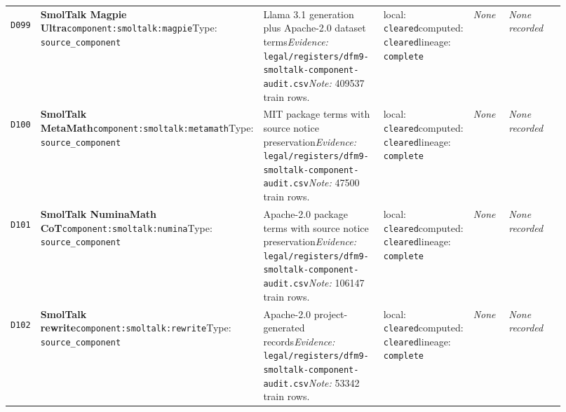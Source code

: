 \documentclass[9pt,a4paper]{article}
\newcommand{\depid}[1]{\hypertarget{dep:#1}{\texttt{#1}}}
\begin{document}
\begin{landscape}
\begin{longtable}{@{}L{0.035\linewidth}L{0.185\linewidth}L{0.27\linewidth}L{0.09\linewidth}L{0.10\linewidth}L{0.24\linewidth}@{}}
\depid{D099} & \textbf{SmolTalk Magpie Ultra}\newline \nolinkurl{component:smoltalk:magpie}\newline Type: \texttt{source\_component} & Llama 3.1 generation plus Apache-2.0 dataset terms\newline \textit{Evidence:} \nolinkurl{legal/registers/dfm9-smoltalk-component-audit.csv}\newline \textit{Note:} 409537 train rows. & local: \texttt{cleared}\newline computed: \texttt{cleared}\newline lineage: \texttt{complete} & \textit{None} & \textit{None recorded} \\
\depid{D100} & \textbf{SmolTalk MetaMath}\newline \nolinkurl{component:smoltalk:metamath}\newline Type: \texttt{source\_component} & MIT package terms with source notice preservation\newline \textit{Evidence:} \nolinkurl{legal/registers/dfm9-smoltalk-component-audit.csv}\newline \textit{Note:} 47500 train rows. & local: \texttt{cleared}\newline computed: \texttt{cleared}\newline lineage: \texttt{complete} & \textit{None} & \textit{None recorded} \\
\depid{D101} & \textbf{SmolTalk NuminaMath CoT}\newline \nolinkurl{component:smoltalk:numina}\newline Type: \texttt{source\_component} & Apache-2.0 package terms with source notice preservation\newline \textit{Evidence:} \nolinkurl{legal/registers/dfm9-smoltalk-component-audit.csv}\newline \textit{Note:} 106147 train rows. & local: \texttt{cleared}\newline computed: \texttt{cleared}\newline lineage: \texttt{complete} & \textit{None} & \textit{None recorded} \\
\depid{D102} & \textbf{SmolTalk rewrite}\newline \nolinkurl{component:smoltalk:rewrite}\newline Type: \texttt{source\_component} & Apache-2.0 project-generated records\newline \textit{Evidence:} \nolinkurl{legal/registers/dfm9-smoltalk-component-audit.csv}\newline \textit{Note:} 53342 train rows. & local: \texttt{cleared}\newline computed: \texttt{cleared}\newline lineage: \texttt{complete} & \textit{None} & \textit{None recorded} \\

\end{longtable}
\end{landscape}
\end{document}
